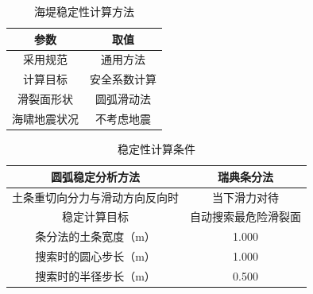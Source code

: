 \documentclass[UTF8, a4paper, 12pt]{ctexart} %
\begin{document}
\newpage
\begin{table}[h]
    \centering
    \caption{海堤稳定性计算方法}
    \begin{tabular}{|c|c|}
        \hline
        \textbf{参数} & \textbf{取值} \\ \hline
        采用规范 & 通用方法 \\ \hline
        计算目标 & 安全系数计算 \\ \hline
        滑裂面形状 & 圆弧滑动法 \\ \hline
        海啸地震状况 & 不考虑地震 \\ \hline
    \end{tabular}
    \label{tab:stability_parameters}
\end{table}

\begin{table}[h]
    \centering
    \caption{稳定性计算条件}
    \begin{tabular}{|c|c|}
        \hline
        \textbf{圆弧稳定分析方法} & \textbf{瑞典条分法} \\ \hline
        土条重切向分力与滑动方向反向时 & 当下滑力对待 \\ \hline
        稳定计算目标 & 自动搜索最危险滑裂面 \\ \hline
        条分法的土条宽度（m） & 1.000 \\ \hline
        搜索时的圆心步长（m） & 1.000 \\ \hline
        搜索时的半径步长（m） & 0.500 \\ \hline
    \end{tabular}
    \label{tab:stability_analysis}
\end{table}
\end{document}
